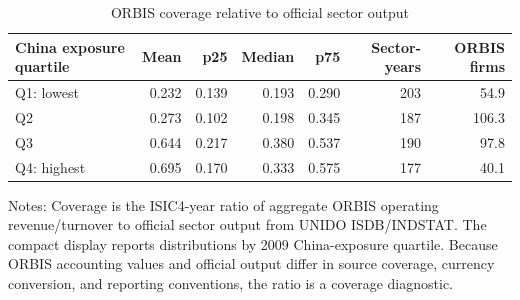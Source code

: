 \begin{table}[!htbp]\centering
\caption{ORBIS coverage relative to official sector output}
\label{tab:orbis_coverage_appendix}
\begin{tabular}{lrrrrrr}
\toprule
China exposure quartile & Mean & p25 & Median & p75 & Sector-years & ORBIS firms \\
\midrule
Q1: lowest & 0.232 & 0.139 & 0.193 & 0.290 & 203 & 54.9 \\
Q2 & 0.273 & 0.102 & 0.198 & 0.345 & 187 & 106.3 \\
Q3 & 0.644 & 0.217 & 0.380 & 0.537 & 190 & 97.8 \\
Q4: highest & 0.695 & 0.170 & 0.333 & 0.575 & 177 & 40.1 \\
\bottomrule
\end{tabular}
\begin{minipage}{0.92\textwidth}
\vspace{0.3em}\footnotesize Notes: Coverage is the ISIC4-year ratio of aggregate ORBIS operating revenue/turnover to official sector output from UNIDO ISDB/INDSTAT. The compact display reports distributions by 2009 China-exposure quartile. Because ORBIS accounting values and official output differ in source coverage, currency conversion, and reporting conventions, the ratio is a coverage diagnostic.
\end{minipage}
\end{table}
